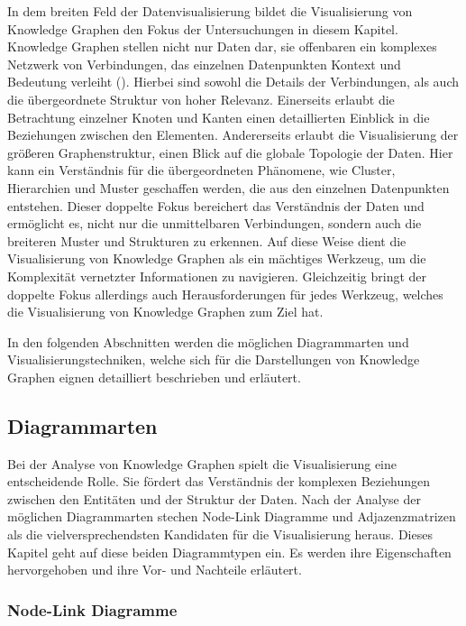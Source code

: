 In dem breiten Feld der Datenvisualisierung bildet die Visualisierung von Knowledge Graphen den Fokus der Untersuchungen in diesem Kapitel. Knowledge Graphen stellen nicht nur Daten dar, sie offenbaren ein komplexes Netzwerk von Verbindungen, das einzelnen Datenpunkten Kontext und Bedeutung verleiht (\cite{knowledgeGraph:whatIs}). Hierbei sind sowohl die Details der Verbindungen, als auch die übergeordnete Struktur von hoher Relevanz. Einerseits erlaubt die Betrachtung einzelner Knoten und Kanten einen detaillierten Einblick in die Beziehungen zwischen den Elementen. Andererseits erlaubt die Visualisierung der größeren Graphenstruktur, einen Blick auf die globale Topologie der Daten. Hier kann ein Verständnis für die übergeordneten Phänomene, wie Cluster, Hierarchien und Muster geschaffen werden, die aus den einzelnen Datenpunkten entstehen. Dieser doppelte Fokus bereichert das Verständnis der Daten und ermöglicht es, nicht nur die unmittelbaren Verbindungen, sondern auch die breiteren Muster und Strukturen zu erkennen. Auf diese Weise dient die Visualisierung von Knowledge Graphen als ein mächtiges Werkzeug, um die Komplexität vernetzter Informationen zu navigieren. Gleichzeitig bringt der doppelte Fokus allerdings auch Herausforderungen für jedes Werkzeug, welches die Visualisierung von Knowledge Graphen zum Ziel hat.

In den folgenden Abschnitten werden die möglichen Diagrammarten und Visualisierungstechniken, welche sich für die Darstellungen von Knowledge Graphen eignen detailliert beschrieben und erläutert.

\subsection{Diagrammarten}
\label{theory:visualization:types}

Bei der Analyse von Knowledge Graphen spielt die Visualisierung eine entscheidende Rolle. Sie fördert das Verständnis der komplexen Beziehungen zwischen den Entitäten und der Struktur der Daten. Nach der Analyse der möglichen Diagrammarten stechen Node-Link Diagramme und Adjazenzmatrizen als die vielversprechendsten Kandidaten für die Visualisierung heraus. Dieses Kapitel geht auf diese beiden  Diagrammtypen ein. Es werden ihre Eigenschaften hervorgehoben und ihre Vor- und Nachteile erläutert.

\subsubsection{Node-Link Diagramme}

